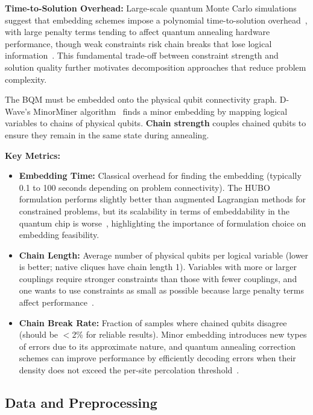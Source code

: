 \documentclass{oqireport}
\begin{document}
\textbf{Time-to-Solution Overhead:}
Large-scale quantum Monte Carlo simulations suggest that embedding schemes impose a polynomial time-to-solution overhead~\cite{prxquantum2040322}, with large penalty terms tending to affect quantum annealing hardware performance, though weak constraints risk chain breaks that lose logical information~\cite{choi2008minor}. This fundamental trade-off between constraint strength and solution quality further motivates decomposition approaches that reduce problem complexity.

The BQM must be embedded onto the physical qubit connectivity graph. D-Wave's MinorMiner algorithm~\cite{cai2014practical} finds a minor embedding by mapping logical variables to chains of physical qubits. \textbf{Chain strength} couples chained qubits to ensure they remain in the same state during annealing.

\textbf{Key Metrics:}
\begin{itemize}
    \item \textbf{Embedding Time:} Classical overhead for finding the embedding (typically 0.1 to 100 seconds depending on problem connectivity). The HUBO formulation performs slightly better than augmented Lagrangian methods for constrained problems, but its scalability in terms of embeddability in the quantum chip is worse~\cite{qute202300104}, highlighting the importance of formulation choice on embedding feasibility.
    \item \textbf{Chain Length:} Average number of physical qubits per logical variable (lower is better; native cliques have chain length 1). Variables with more or larger couplings require stronger constraints than those with fewer couplings, and one wants to use constraints as small as possible because large penalty terms affect performance~\cite{choi2008minor}.
    \item \textbf{Chain Break Rate:} Fraction of samples where chained qubits disagree (should be $<$2\% for reliable results). Minor embedding introduces new types of errors due to its approximate nature, and quantum annealing correction schemes can improve performance by efficiently decoding errors when their density does not exceed the per-site percolation threshold~\cite{vinci2016nested}.
\end{itemize}




\subsection{Data and Preprocessing}
\label{subs:data}
\end{document}
